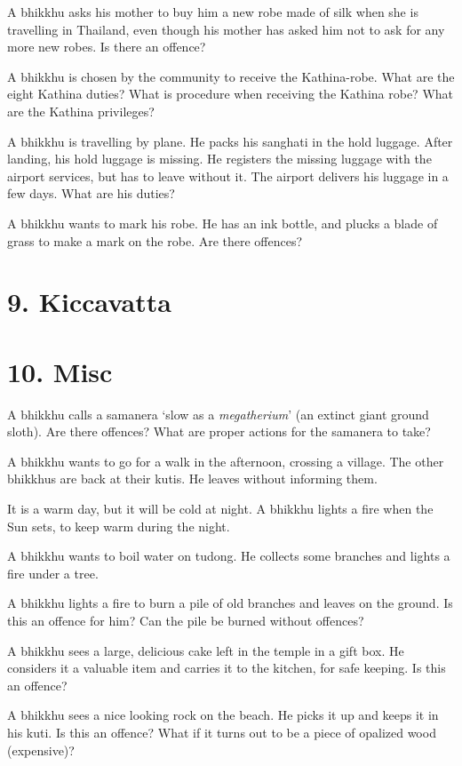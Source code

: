 A bhikkhu asks his mother to buy him a new robe made of silk when she is
travelling in Thailand, even though his mother has asked him not to ask
for any more new robes. Is there an offence?

A bhikkhu is chosen by the community to receive the Kathina-robe. What
are the eight Kathina duties? What is procedure when receiving the
Kathina robe? What are the Kathina privileges?

A bhikkhu is travelling by plane. He packs his sanghati in the hold
luggage. After landing, his hold luggage is missing. He registers the
missing luggage with the airport services, but has to leave without it.
The airport delivers his luggage in a few days. What are his duties?

A bhikkhu wants to mark his robe. He has an ink bottle, and plucks a
blade of grass to make a mark on the robe. Are there offences?

\section{9. Kiccavatta}

\section{10. Misc}

A bhikkhu calls a samanera `slow as a \emph{megatherium}' (an extinct
giant ground sloth). Are there offences? What are proper actions for the
samanera to take?

A bhikkhu wants to go for a walk in the afternoon, crossing a village.
The other bhikkhus are back at their kutis. He leaves without informing
them.

It is a warm day, but it will be cold at night. A bhikkhu lights a fire
when the Sun sets, to keep warm during the night.

A bhikkhu wants to boil water on tudong. He collects some branches and
lights a fire under a tree.

A bhikkhu lights a fire to burn a pile of old branches and leaves on the
ground. Is this an offence for him? Can the pile be burned without
offences?

A bhikkhu sees a large, delicious cake left in the temple in a gift box.
He considers it a valuable item and carries it to the kitchen, for safe
keeping. Is this an offence?

A bhikkhu sees a nice looking rock on the beach. He picks it up and
keeps it in his kuti. Is this an offence? What if it turns out to be a
piece of opalized wood (expensive)?

